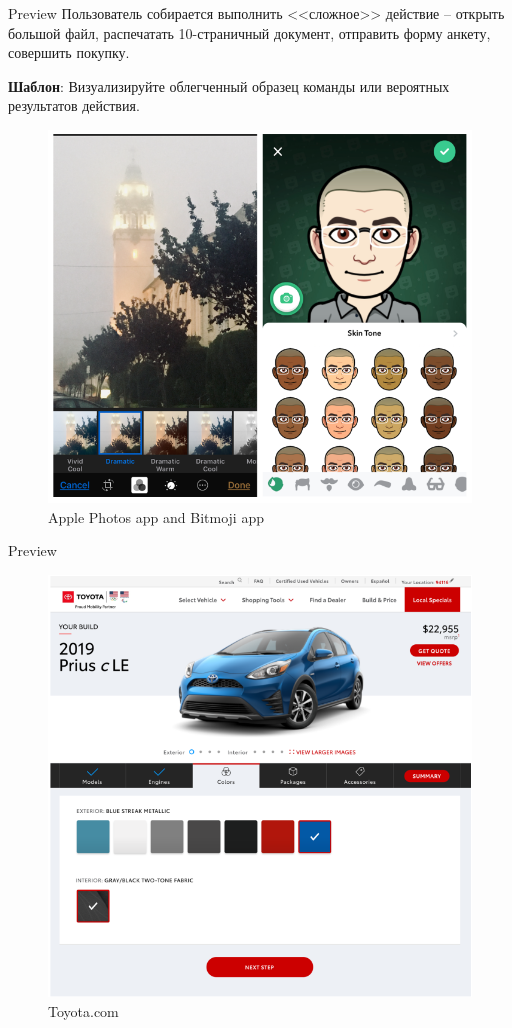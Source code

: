 \documentclass{beamer}
\begin{document}
\begin{frame}[t]{Preview}
	Пользователь собирается выполнить <<сложное>> действие -- открыть большой файл, распечатать 10-страничный документ, отправить форму анкету, совершить покупку.
	
	\textbf{Шаблон}: Визуализируйте облегченный образец команды или вероятных результатов действия.
	\begin{figure}[h]
		\centering
		\includegraphics[scale=0.3]{images/lec08-pic16.png}
		\caption{Apple Photos app and Bitmoji app}
	\end{figure}
\end{frame}

\begin{frame}[t]{Preview}
	\begin{figure}[h]
		\centering
		\includegraphics[scale=0.35]{images/lec08-pic17.png}
		\caption{Toyota.com}
	\end{figure}
\end{frame}
\end{document}
